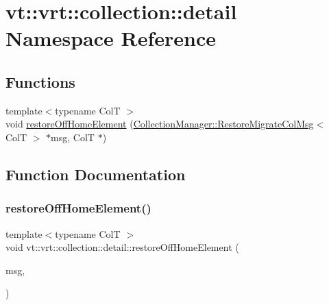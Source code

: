 \hypertarget{namespacevt_1_1vrt_1_1collection_1_1detail}{}\section{vt\+:\+:vrt\+:\+:collection\+:\+:detail Namespace Reference}
\label{namespacevt_1_1vrt_1_1collection_1_1detail}
\subsection*{Functions}
\begin{DoxyCompactItemize}
\item 
{\footnotesize template$<$typename ColT $>$ }\\void \hyperlink{namespacevt_1_1vrt_1_1collection_1_1detail_a2a387e68b1392802fedbec74969cd988}{restore\+Off\+Home\+Element} (\hyperlink{structvt_1_1vrt_1_1collection_1_1_collection_manager_1_1_restore_migrate_col_msg}{Collection\+Manager\+::\+Restore\+Migrate\+Col\+Msg}$<$ ColT $>$ $\ast$msg, ColT $\ast$)
\end{DoxyCompactItemize}


\subsection{Function Documentation}
\mbox{\label{namespacevt_1_1vrt_1_1collection_1_1detail_a2a387e68b1392802fedbec74969cd988}} 
\subsubsection{\texorpdfstring{restore\+Off\+Home\+Element()}{restoreOffHomeElement()}}
{\footnotesize\ttfamily template$<$typename ColT $>$ \\
void vt\+::vrt\+::collection\+::detail\+::restore\+Off\+Home\+Element (\begin{DoxyParamCaption}\item[{\hyperlink{structvt_1_1vrt_1_1collection_1_1_collection_manager_1_1_restore_migrate_col_msg}{Collection\+Manager\+::\+Restore\+Migrate\+Col\+Msg}$<$ ColT $>$ $\ast$}]{msg,  }\item[{ColT $\ast$}]{ }\end{DoxyParamCaption})\hspace{0.3cm}{\ttfamily [inline]}}


